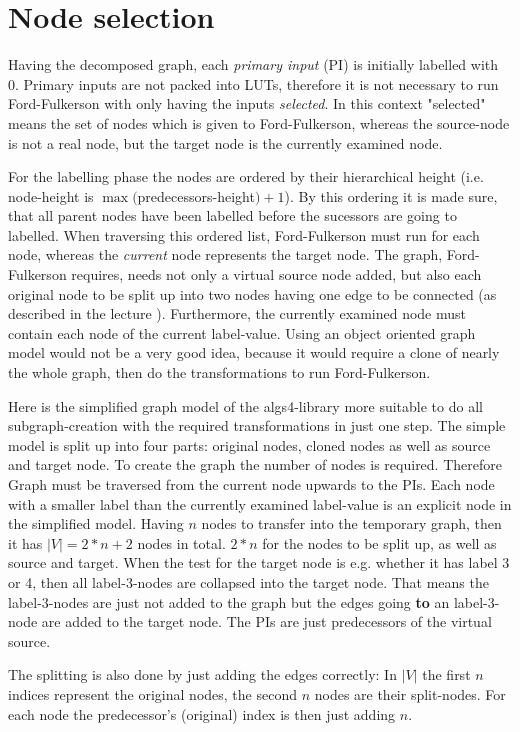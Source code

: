 \section{Node selection}
Having the decomposed graph, each \textit{primary input} (PI) is initially labelled with 0. Primary inputs are not packed into LUTs, therefore it is not necessary to run Ford-Fulkerson with only having the inputs \textit{selected}. In this context "selected" means the set of nodes which is given to Ford-Fulkerson, whereas the source-node is not a real node, but the target node is the currently examined node.
\par
For the labelling phase the nodes are ordered by their hierarchical height (i.e. node-height is $\max($predecessors-height$)+1$). By this ordering it is made sure, that all parent nodes have been labelled before the sucessors are going to labelled. When traversing this ordered list, Ford-Fulkerson must run for each node, whereas the \textit{current} node represents the target node. The graph, Ford-Fulkerson requires, needs not only a virtual source node added, but also each original node to be split up into two nodes having one edge to be connected (as described in the lecture \cite{Hochberger2017}). Furthermore, the currently examined node must contain each node of the current label-value. Using an object oriented graph model would not be a very good idea, because it would require a clone of nearly the whole graph, then do the transformations to run Ford-Fulkerson.
\par
Here is the simplified graph model of the algs4-library more suitable to do all subgraph-creation with the required transformations in just one step. The simple model is split up into four parts: original nodes, cloned nodes as well as source and target node. To create the graph the number of nodes is required. Therefore Graph must be traversed from the current node upwards to the PIs. Each node with a smaller label than the currently examined label-value is an explicit node in the simplified model. Having $n$ nodes to transfer into the temporary graph, then it has $|V|=2*n+2$ nodes in total. $2*n$ for the nodes to be split up, as well as source and target. When the test for the target node is e.g. whether it has label 3 or 4, then all label-3-nodes are collapsed into the target node. That means the label-3-nodes are just not added to the graph but the edges going \textbf{to} an label-3-node are added to the target node. The PIs are just predecessors of the virtual source.
\par
The splitting is also done by just adding the edges correctly: In $|V|$ the first $n$ indices represent the original nodes, the second $n$ nodes are their split-nodes. For each node the predecessor's (original) index is then just adding $n$.
